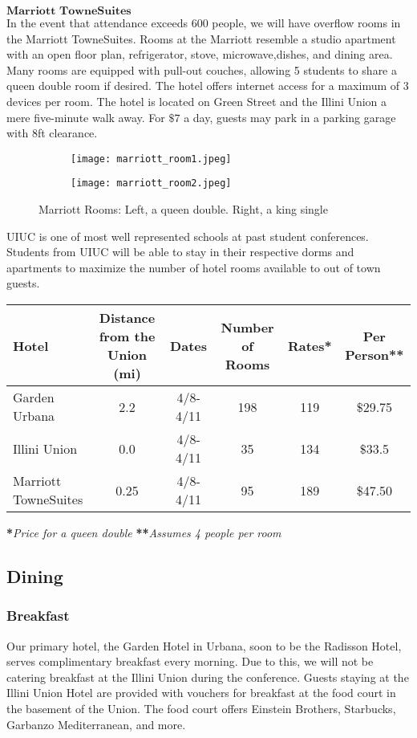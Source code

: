 $\textbf{Marriott TowneSuites}$\\
In the event that attendance exceeds 600 people, we will have overflow rooms in the Marriott TowneSuites. Rooms at the Marriott resemble a studio apartment with an open floor plan, refrigerator, stove, microwave,dishes, and dining area. Many rooms are equipped with pull-out couches, allowing 5 students to share a queen double room if desired. The hotel offers internet access for a maximum of 3 devices per room. The hotel is located on Green Street and the Illini Union a mere five-minute walk away. For $\$7$ a day, guests may park in a parking garage with 8ft clearance.\\
\begin{figure}[H]
	\centering
	\begin{subfigure}{0.5\textwidth}
		\centering
		\texttt{[image: marriott\_room1.jpeg]}
	\end{subfigure}%
	\begin{subfigure}{0.5\textwidth}
		\centering
		\texttt{[image: marriott\_room2.jpeg]}
	\end{subfigure}
	\caption{Marriott Rooms: Left, a queen double. Right, a king single}		
\end{figure} 

UIUC is one of most well represented schools at past student conferences. Students from UIUC will be able to stay in their respective dorms and apartments to maximize the number of hotel rooms available to out of town guests. 

{\centering
\begin{tabular}{lccccc}
\hline\hline
\textbf{Hotel} & \textbf{Distance from the Union (mi)} & \textbf{Dates} & \textbf{Number of Rooms} & \textbf{Rates*} & \textbf{Per Person**}\\
\hline\hline
Garden Urbana & 2.2  & 4/8-4/11 & 198 & 119 & $\$$29.75\\
Illini Union & 0.0 & 4/8-4/11 & 35 & 134 & $\$$33.5\\
Marriott TowneSuites &0.25 & 4/8-4/11 & 95 & 189 & \$47.50\\ 
\end{tabular}}
\textbf{*}\textit{Price for a queen double}
\textbf{**}\textit{Assumes 4 people per room}

\subsection{Dining}
\subsubsection{Breakfast}
Our primary hotel, the Garden Hotel in Urbana, soon to be the Radisson Hotel, serves complimentary breakfast every morning. Due to this, we will not be catering breakfast at the Illini Union during the conference. Guests staying at the Illini Union Hotel are provided with vouchers for breakfast at the food court in the basement of the Union. The food court offers Einstein Brothers, Starbucks, Garbanzo Mediterranean, and more. 
